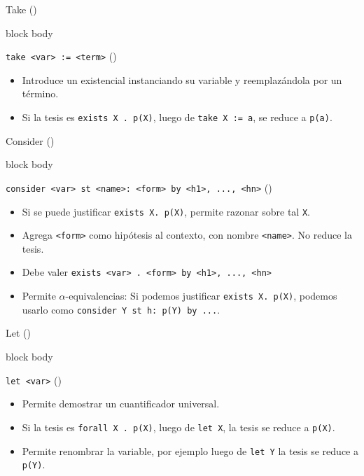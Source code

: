\documentclass[xcolor={dvipsnames},spanish]{beamer}
\newenvironment{command}
    {
        \begin{beamercolorbox}[sep=8pt,center,shadow=true,rounded=true]{block body}
    }
    {\end{beamercolorbox}}
\begin{document}
\begin{frame}[fragile]{Take ()}
    \begin{command}
        \lstinline{take <var> := <term>} \quad ()
    \end{command}
    \vfill
    \begin{itemize}
        \item Introduce un existencial instanciando su variable y reemplazándola por un término.
        \item Si la tesis es \lstinline{exists X . p(X)}, luego de \lstinline{take X := a}, se reduce a \lstinline{p(a)}.
    \end{itemize}
\end{frame}

\begin{frame}[fragile]{Consider ()}
    \begin{command}
        \lstinline{consider <var> st <name>: <form> by <h1>, ..., <hn>} \quad ()
    \end{command}
    \begin{itemize}
        \item Si se puede justificar \lstinline{exists X. p(X)}, permite razonar sobre tal \lstinline{X}.
        \item Agrega \lstinline{<form>} como hipótesis al contexto, con nombre \lstinline{<name>}. No reduce la tesis.
        \item Debe valer \lstinline{exists <var> . <form> by <h1>, ..., <hn>}
        \item Permite $\alpha$-equivalencias: Si podemos justificar \lstinline{exists X. p(X)}, podemos usarlo como \lstinline{consider Y st h: p(Y) by ...}.
    \end{itemize}
\end{frame}

\begin{frame}[fragile]{Let ()}
    \begin{command}
        \lstinline{let <var>} \quad ()
    \end{command}
    \begin{itemize}
        \item Permite demostrar un cuantificador universal.
        \item Si la tesis es \lstinline{forall X . p(X)}, luego de \lstinline{let X}, la tesis se reduce a \lstinline{p(X)}.
        \item Permite renombrar la variable, por ejemplo luego de \lstinline{let Y} la tesis se reduce a \lstinline{p(Y)}.
    \end{itemize}
\end{frame}
\end{document}
